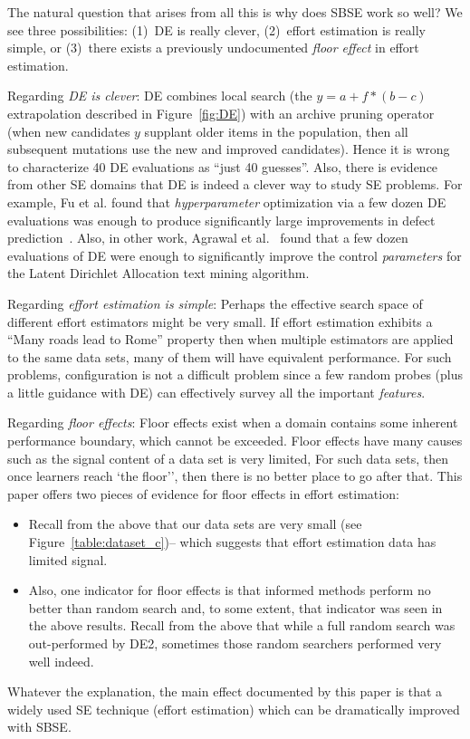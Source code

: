 \documentclass[10pt,conference]{IEEEtran}
\newcommand{\bi}{\begin{itemize}}
\newcommand{\ei}{\end{itemize}}
\newcommand{\fig}[1]{Figure~\ref{fig:#1}}
\begin{document}
The natural question that arises from all this is why does SBSE work so well? We see  three
possibilities: (1)~DE is really clever, (2)~effort estimation is really simple, or (3)~there exists a previously undocumented {\em floor effect} in effort
estimation.

Regarding {\em DE is clever}:  DE combines  local search  (the $y=a+f*(b-c)$ extrapolation described in \fig{DE}) with an archive pruning operator (when    new candidates $y$   supplant older items in the population, then all subsequent mutations use the new and improved candidates). Hence it is wrong to characterize   40 DE evaluations as ``just 40 guesses''. Also, there is evidence from other SE domains that
DE is indeed a clever way to study SE problems. For example, Fu et al. found that {\em hyperparameter} optimization
via a few dozen DE evaluations
was enough to produce significantly large improvements in defect prediction~\cite{Fu2016TuningFS}.
Also, in other work, Agrawal et al.~\cite{AGRAWAL2018} found that  a few
dozen evaluations of DE were enough
to significantly improve the control {\em parameters}
for the Latent Dirichlet Allocation text
mining algorithm.

Regarding {\em effort estimation  is simple}:  Perhaps  the   effective search
space of different effort estimators might be  very small. If effort estimation exhibits a ``Many roads lead to Rome'' property then
when multiple estimators are applied to the same data sets,  many of them will have equivalent performance. For such problems, configuration is not
a difficult problem since a few random probes (plus a little guidance with DE) can effectively survey all the important 
{\em features}.

Regarding {\em floor effects}: Floor effects exist when  a domain contains
some inherent performance boundary, which cannot be exceeded.
Floor effects have many causes such as the signal content of a data set is very limited,
For such data sets, then once learners reach
`the floor'', then there is no better place
to go after that.  This paper offers two pieces of evidence for floor effects in effort estimation:
\bi
\item
Recall from the above that our data sets are very small
(see Figure~\ref{table:dataset_c})-- which
suggests that effort estimation data has limited
signal. 
\item
Also, one indicator for floor effects is that informed methods perform no better
than random search and, to some extent, that indicator was seen in the above results.
Recall from the above that while a full random search was out-performed by DE2, sometimes those random
searchers performed very well indeed.
\ei
Whatever the explanation, the main effect documented by this paper   is that   a widely used SE
technique (effort estimation) which can be dramatically
improved with SBSE.
\end{document}
